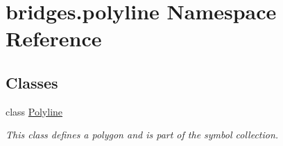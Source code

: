 \hypertarget{namespacebridges_1_1polyline}{}\section{bridges.\+polyline Namespace Reference}
\label{namespacebridges_1_1polyline}
\subsection*{Classes}
\begin{DoxyCompactItemize}
\item 
class \mbox{\hyperlink{classbridges_1_1polyline_1_1_polyline}{Polyline}}
\begin{DoxyCompactList}\small\item\em This class defines a polygon and is part of the symbol collection. \end{DoxyCompactList}\end{DoxyCompactItemize}
